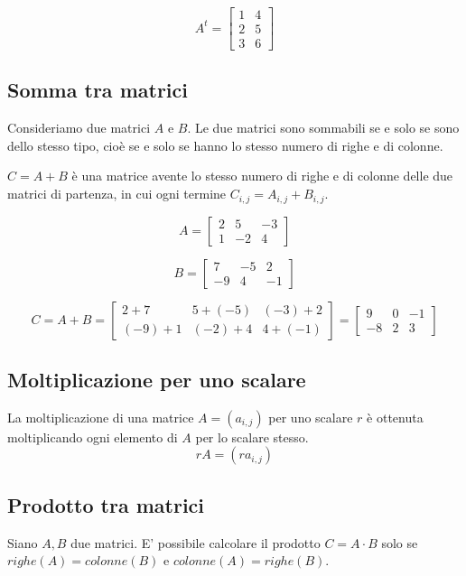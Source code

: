 $$
A^t =
\begin{bmatrix}
    1 & 4 \\
    2 & 5 \\
    3 & 6
\end{bmatrix}
$$

\subsection{Somma tra matrici}

Consideriamo due matrici $A$ e $B$. Le due matrici sono sommabili se
e solo se sono dello stesso tipo, cioè se e solo se hanno lo stesso
numero di righe e di colonne.

$C=A+B$ è una matrice avente lo stesso numero di righe e di colonne
delle due matrici di partenza, in cui ogni termine
$C_{i,j}=A_{i,j}+B_{i,j}$.

$$
A =
    \begin{bmatrix}
    2 & 5 & -3 \\
    1 & -2 & 4
    \end{bmatrix}
$$

$$
B =
    \begin{bmatrix}
    7 & -5 & 2 \\
    -9 & 4 & -1
    \end{bmatrix}
$$

$$
C = A+B = \begin{bmatrix}
    2+7 & 5+(-5) & (-3)+2 \\
    (-9)+1 & (-2)+4 & 4+(-1)
    \end{bmatrix}
    =
    \begin{bmatrix}
    9 & 0 & -1 \\
    -8 & 2 & 3
    \end{bmatrix}
$$

\subsection{Moltiplicazione per uno scalare}

La moltiplicazione di una matrice $A=(a_{i,j})$ per uno scalare $r$ è ottenuta moltiplicando ogni elemento di $A$ per lo scalare stesso.
$$ rA = (ra_{i,j}) $$

\subsection{Prodotto tra matrici}

\begin{definition}
Siano $A, B$ due matrici. E' possibile calcolare il prodotto $C=A \cdot B$
solo se $righe(A) = colonne(B)$ e $colonne(A) = righe(B)$.
\end{definition}

